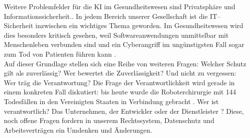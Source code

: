 Weitere Problemfelder für die KI im Gesundheitswesen sind Privatsphäre und Informationssicherheit.\cite{Opportunities_challenges_ai_hc}. In jedem Bereich unserer Gesellschaft ist die IT–Sicherheit inzwischen ein wichtiges Thema geworden. Im Gesundheitswesen wird dies besonders kritisch gesehen, weil Softwareanwendungen unmittelbar mit Menschenleben verbunden sind und ein Cyberangriff im ungünstigsten Fall sogar zum Tod von Patienten führen kann \cite{Opportunities_challenges_ai_hc}.\\
Auf dieser Grundlage stellen sich eine Reihe von weiteren Fragen: Welcher Schutz gilt als zuverlässig? Wer bewertet die Zuverlässigkeit? Und nicht zu vergessen: Wer träg die Verantwortung? 
Die Frage der Verantwortlichkeit wird gerade in einem konkreten Fall diskutiert: bis heute wurde die Roboterchirurgie mit 144 Todesfällen in den Vereinigten Staaten in Verbindung gebracht \cite{Chapter_14}. Wer ist verantwortlich? Das Unternehmen, der Entwickler oder der Dienstleister \cite{Chapter_14}? Diese, noch offene Fragen fordern in unserem Rechtssystem, Datenschutz und Arbeitsverträgen ein Umdenken und Änderungen. \\
